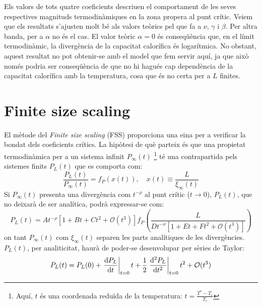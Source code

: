 \documentclass[a4paper]{article}
\begin{document}
Els valors de tots quatre coeficients descriuen el comportament de les seves respectives magnituds termodinàmiques en la zona propera al punt crític. Veiem que els resultats s'ajusten molt bé als valors teòrics pel que fa a $\nu$, $\gamma$ i $\beta$. Per altra banda, per a $\alpha$ no és el cas. El valor teòric $\alpha=0$ és conseqüència que, en el límit termodinàmic, la divergència de la capacitat calorífica és logarítmica. No obstant, aquest resultat no pot obtenir-se amb el model que fem servir aquí, ja que això només podria ser conseqüència de que no hi hagués cap dependència de la capacitat calorífica amb la temperatura, cosa que és no certa per a $L$ finites.

\section{Finite size scaling}

El mètode del \textit{Finite size scaling} (FSS) proporciona una eina per a verificar la bondat dels coeficients crítics. La hipòtesi de què parteix és que una propietat termodinàmica per a un sistema infinit $P_\infty (t)$ \footnote{Aquí, $t$ és una coordenada reduïda de la temperatura: $t = \frac{T^* - T_c}{T_c}$} té una contrapartida pels sistemes finits $P_L (t)$ que es comporta com:
\begin{equation*}
    \frac{P_L(t)}{P_\infty (t)} = f_P \left(x(t) \right), \quad x(t) \equiv \frac{L}{\xi_\infty (t)}
\end{equation*}
Si $P_\infty (t)$ presenta una divergència com $t^{-\rho}$ al punt crític ($t \to 0$), $P_L (t)$, que no deixarà de ser analítica, podrà expressar-se com:
\begin{equation*}
    P_L (t) = A t^{-\rho}\left[ 1 + Bt + Ct^2 + \mathcal{O}(t^3) \right] f_P \left( \frac{L}{D t^{-\nu} \left[ 1 + Et + Ft^2 + \mathcal{O}(t^3) \right]} \right)
\end{equation*}
on tant $P_\infty (t)$ com $\xi_\infty (t)$ separen les parts analítiques de les divergències. $P_L (t)$, per analiticitat, haurà de poder-se desenvolupar per sèries de Taylor:
\begin{equation*}
    P_L (t) = P_L (0) + \left.\dv{P_L}{t} \right|_{t=0} t + \frac{1}{2} \left.\dv[2]{P_L}{t} \right|_{t=0} t^2 + \mathcal{O}(t^3)
\end{equation*}
\end{document}
